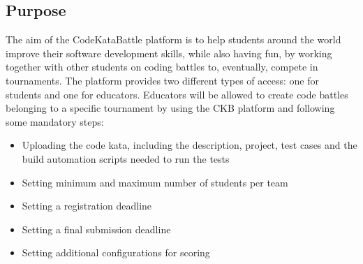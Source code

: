 \documentclass[12pt,oneside,a4paper]{article}
\begin{document}
\subsection{Purpose}
The aim of the CodeKataBattle platform is to help students around the world improve their software development skills, while also having fun, by working together with other students on coding battles to, eventually, compete in tournaments. The platform provides two different types of access: one for students and one for educators. 
Educators will be allowed to create code battles belonging to a specific tournament by using the CKB platform and following some mandatory steps:
\begin{itemize}
    \item Uploading the code kata, including the description, project, test cases and the build automation scripts needed to run the tests
    \item Setting minimum and maximum number of students per team
    \item Setting a registration deadline
    \item Setting a final submission deadline
    \item Setting additional configurations for scoring
\end{itemize}
\end{document}
